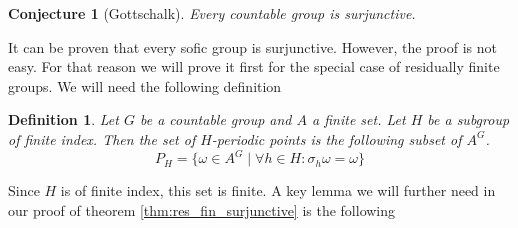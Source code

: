\documentclass[titlepage, a4paper]{article}
\newtheorem{definition}{Definition}
\newtheorem{conjecture}{Conjecture}
\theoremstyle{remark}
\begin{document}
    \begin{conjecture}[Gottschalk] \label{conj:gottschalk}
        Every countable group is surjunctive.
    \end{conjecture}

    It can be proven that every sofic group is surjunctive. However, the proof is not easy. For that reason we will prove it first for the special case of residually finite groups. We will need the following definition

    \begin{definition}
        Let $G$ be a countable group and $A$ a finite set. Let $H$ be a subgroup of finite index. Then the set of $H$-periodic points is the following subset of $A^G$.
        \[
        P_H = \{ \omega \in A^G  \mid \forall h \in H: \sigma_h\omega = \omega\}
        \]
    \end{definition}

    Since $H$ is of finite index, this set is finite. %
    A key lemma we will further need in our proof of theorem \ref{thm:res_fin_surjunctive} is the following
\end{document}
